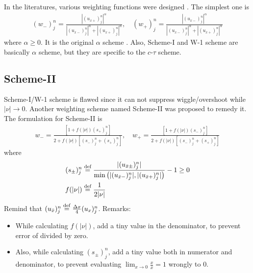\documentclass{turgon}
\begin{document}
In the literatures, various weighting functions were
designed \citep{chang_method_1995, chang_courant_2002,
chang_multi-dimensional_2003}.  The simplest one is
\begin{align}
  (w_-)_j^n =
    \frac{|(u_{x+})_j^n|^{\alpha}}
         {|(u_{x-})_j^n|^{\alpha}+|(u_{x+})_j^n|^{\alpha}}, \quad
  (w_+)_j^n =
    \frac{|(u_{x-})_j^n|^{\alpha}}
         {|(u_{x-})_j^n|^{\alpha}+|(u_{x+})_j^n|^{\alpha}}
  \label{e:alpha}
\end{align}
where $\alpha\ge0$.  It is the original $\alpha$ scheme
\citep[][Eq.~(4.39)]{chang_method_1995}.  Also, Scheme-I
\citep[][Eq.~(2.21)]{chang_courant_2002} and W-1 scheme \citep[][Eq.~(2.38a),
(2.38b)]{chang_multi-dimensional_2003} are basically $\alpha$ scheme, but they
are specific to the $c$-$\tau$ scheme.

\subsection{Scheme-II}

Scheme-I/W-1 scheme is flawed since it can not suppress wiggle/overshoot while
$|\nu|\rightarrow0$.  Another weighting scheme named Scheme-II was proposed to
remedy it.  The formulation for Scheme-II is
\begin{align}
  w_- = \frac{[1+f(|\nu|)(s_+)_j^n]}
             {2 + f(|\nu|)[(s_-)_j^n+(s_+)_j^n]}, \quad
  w_+ = \frac{[1+f(|\nu|)(s_-)_j^n]}
             {2 + f(|\nu|)[(s_-)_j^n+(s_+)_j^n]}
  \label{e:Scheme-II}
\end{align}
where
\begin{align}
  (s_{\pm})_j^n &\defeq
    \frac{|(u_{\bar{x}\pm})_j^n|}
         {\min\left(|(u_{\bar{x}-})_j^n|,
                    |(u_{\bar{x}+})_j^n|\right)} - 1
    \ge 0 \label{e:Scheme-IIs} \\
  f(|\nu|) &\defeq
    \frac{1}{2|\nu|} \label{e:Scheme-IIf}
\end{align}
Remind that $(u_{\bar{x}})_j^n\defeq \frac{\Delta x}{4}(u_x)_j^n$.  Remarks:
\begin{itemize}
  \item While calculating $f(|\nu|)$, add a tiny value in the denominator, to
  prevent error of divided by zero.
  \item Also, while calculating $(s_{\pm})_j^n$, add a tiny value both in
  numerator and denominator, to prevent evaluating $\lim_{x\rightarrow0}
  \frac{x}{x} = 1$ wrongly to 0.
\end{itemize}
\citep[See also][Eq.~(3.23), (3.26), (3.27)]{chang_courant_2002}
\end{document}
